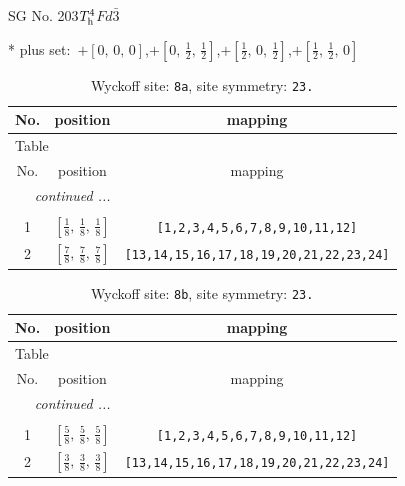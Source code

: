 \documentclass[fleqn,8pt]{jsarticle}
\begin{document}
\setcounter{MaxMatrixCols}{32}

\renewcommand{\tablename}{Table~}
\renewcommand{\figurename}{Figure~}
\begin{center}
\LARGE
SG No. 203\quad$T_{\rm h}^{4}$\quad$Fd\bar{3}$\quad[ cubic ]
\end{center}
* plus set:\,\,\,$+\left[ 0,\, 0,\, 0 \right]$,\quad $+\left[ 0,\, \frac{1}{2},\, \frac{1}{2} \right]$,\quad $+\left[ \frac{1}{2},\, 0,\, \frac{1}{2} \right]$,\quad $+\left[ \frac{1}{2},\, \frac{1}{2},\, 0 \right]$
\renewcommand{\arraystretch}{1.2}
\begin{longtable}{ccc}
\caption{Wyckoff site: {\tt 8a}, site symmetry: {\tt 23.}}
 \\
 \hline \hline
No. & position & mapping \\ \hline \endfirsthead

\multicolumn{2}{l}{\tablename\ \thetable{}} \\
 \hline \hline
No. & position & mapping \\ \hline \endhead

 \hline \hline
\multicolumn{2}{r}{\footnotesize\it continued ...} \\ \endfoot

 \hline \hline
\multicolumn{2}{r}{} \\ \endlastfoot

1 & $\left[ \frac{1}{8},\, \frac{1}{8},\, \frac{1}{8} \right]$ & {\tt [1,2,3,4,5,6,7,8,9,10,11,12]} \\ \hline
2 & $\left[ \frac{7}{8},\, \frac{7}{8},\, \frac{7}{8} \right]$ & {\tt [13,14,15,16,17,18,19,20,21,22,23,24]} \\
\end{longtable}
\renewcommand{\arraystretch}{1.2}
\begin{longtable}{ccc}
\caption{Wyckoff site: {\tt 8b}, site symmetry: {\tt 23.}}
 \\
 \hline \hline
No. & position & mapping \\ \hline \endfirsthead

\multicolumn{2}{l}{\tablename\ \thetable{}} \\
 \hline \hline
No. & position & mapping \\ \hline \endhead

 \hline \hline
\multicolumn{2}{r}{\footnotesize\it continued ...} \\ \endfoot

 \hline \hline
\multicolumn{2}{r}{} \\ \endlastfoot

1 & $\left[ \frac{5}{8},\, \frac{5}{8},\, \frac{5}{8} \right]$ & {\tt [1,2,3,4,5,6,7,8,9,10,11,12]} \\ \hline
2 & $\left[ \frac{3}{8},\, \frac{3}{8},\, \frac{3}{8} \right]$ & {\tt [13,14,15,16,17,18,19,20,21,22,23,24]} \\
\end{longtable}
\end{document}
